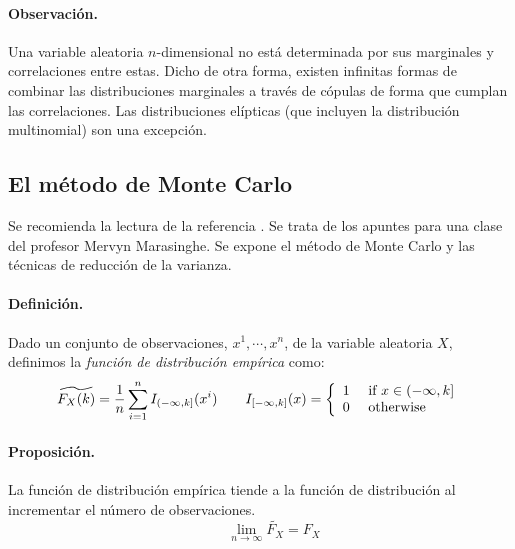 \paragraph{Observaci\'on.} Una variable aleatoria $n$-dimensional no est\'a 
determinada por sus marginales y correlaciones entre estas. Dicho de otra
forma, existen infinitas formas de combinar las distribuciones marginales
 a trav\'es de c\'opulas de forma que cumplan las correlaciones. Las distribuciones 
el\'ipticas (que incluyen la distribuci\'on multinomial) son una excepci\'on. 


\subsection{El m\'etodo de Monte Carlo}

Se recomienda la lectura de la referencia \cite{mc:mervyn}. Se trata de los 
apuntes para una clase del profesor Mervyn Marasinghe. Se expone el m\'etodo 
de Monte Carlo y las t\'ecnicas de reducci\'on de la varianza.

\paragraph{Definici\'on.} Dado un conjunto de observaciones, $x^1, \cdots, x^n$,
de la variable aleatoria $X$, definimos la \emph{funci\'on de distribuci\'on emp\'irica}
 como:
\begin{displaymath}
\widetilde{F_X(k)} = \frac{1}{n} \sum_{i=1}^{n} I_{(-\infty,k]}(x^i) \qquad
I_{[-\infty,k]}(x) = \left\{
\begin{array}{ll}
1 & \textrm{ if } x \in (-\infty,k] \cr
0 & \textrm{ otherwise}
\end{array}
\right.
\end{displaymath}

\paragraph{Proposici\'on.} La funci\'on de distribuci\'on emp\'irica tiende a 
la funci\'on de distribuci\'on al incrementar el n\'umero de observaciones.
\begin{displaymath}
\qquad \lim_{n\to\infty} \widetilde{F_X} = F_X
\end{displaymath}

